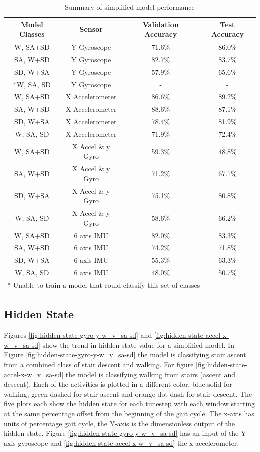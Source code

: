 \documentclass[sensors,article,submit,moreauthors,pdftex]{Definitions/mdpi}
\begin{document}
\begin{table}[!hbt]
    \centering
    \caption{Summary of simplified model performance}
    \label{tab:simplified_model_perfomances}
    \begin{tabular}{cccc}
        \textbf{Model Classes} & \textbf{Sensor} & \textbf{Validation Accuracy} & \textbf{Test Accuracy}\\
        \hline
        W, SA+SD & Y Gyroscope & 71.6\% & 86.0\% \\
        SA, W+SD & Y Gyroscope & 82.7\% & 83.7\% \\
        SD, W+SA & Y Gyroscope & 57.9\% & 65.6\% \\
        *W, SA, SD & Y Gyroscope & - & - \\
        W, SA+SD & X Accelerometer & 86.6\% & 89.2\% \\
        SA, W+SD & X Accelerometer & 88.6\% & 87.1\% \\
        SD, W+SA & X Accelerometer & 78.4\% & 81.9\% \\
        W, SA, SD & X Accelerometer & 71.9\% & 72.4\%\\
        W, SA+SD & X Accel \& y Gyro & 59.3\% & 48.8\% \\
        SA, W+SD & X Accel \& y Gyro & 71.2\% & 67.1\% \\
        SD, W+SA & X Accel \& y Gyro & 75.1\% & 80.8\% \\
        W, SA, SD & X Accel \& y Gyro & 58.6\% & 66.2\%\\
        W, SA+SD & 6 axis IMU & 82.0\% & 83.3\% \\
        SA, W+SD & 6 axis IMU & 74.2\% & 71.8\% \\
        SD, W+SA & 6 axis IMU & 55.3\% & 63.3\% \\
        W, SA, SD & 6 axis IMU & 48.0\% & 50.7\%\\
        \multicolumn{4}{l}{\footnotesize{* Unable to train a model that could classify this set of classes}}
    \end{tabular}
\end{table}

\subsection{Hidden State}
Figures \ref{fig:hidden-state-gyro-y-w_v_sa-sd} and \ref{fig:hidden-state-accel-x-w_v_sa-sd} show the trend in hidden state value for a simplified model. In Figure \ref{fig:hidden-state-gyro-y-w_v_sa-sd} the model is classifying stair ascent from a combined class of stair descent and walking. For figure \ref{fig:hidden-state-accel-x-w_v_sa-sd} the model is classifying walking from stairs (ascent and descent). Each of the activities is plotted in a different color, blue solid for walking, green dashed for stair ascent and orange dot dash for stair descent. The five plots each show the hidden state for each timestep with each window starting at the same percentage offset from the beginning of the gait cycle. The x-axis has units of percentage gait cycle, the Y-axis is the dimensionless output of the hidden state. Figure \ref{fig:hidden-state-gyro-y-w_v_sa-sd} has an input of the Y axis gyroscope and \ref{fig:hidden-state-accel-x-w_v_sa-sd} the x accelerometer.
\end{document}
